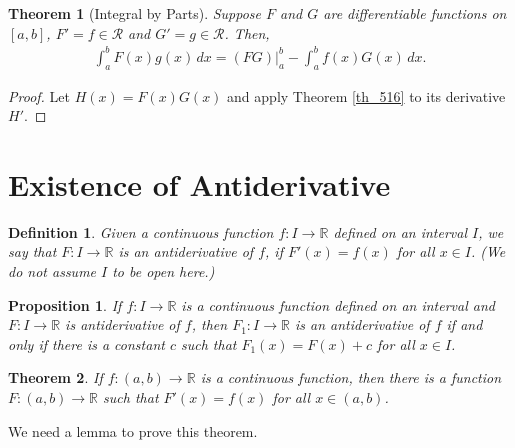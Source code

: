 \documentclass[10pt]{book}
\newtheorem{definition}{Definition}[chapter]
\newtheorem{theorem}{Theorem}[chapter]
\newtheorem{proposition}{Proposition}[chapter]
\theoremstyle{definition}
\numberwithin{equation}{chapter}
\begin{document}
\medskip

\begin{theorem}[Integral by Parts]
Suppose $F$ and $G$ are differentiable functions on $[a,b]$, $F' = f \in \mathscr{R}$ and $G' = g \in \mathscr{R}$. Then,
\begin{align*}
    \int^b_a F(x)g(x) \,dx = (FG)\bigg|^b_a - \int^b_a f(x)G(x) \,dx.
\end{align*}
\end{theorem}
\begin{proof}
Let $H(x) = F(x)G(x)$ and apply Theorem \ref{th_516} to its derivative $H'$.
\end{proof}

\medskip






\section{Existence of Antiderivative}

\begin{definition}
Given a continuous function $f: I \to \mathbb{R}$ defined on an interval $I$, we say that $F: I \to \mathbb{R}$ is an antiderivative of $f$, if $F'(x) = f(x)$ for all $x \in I$. (We do not assume $I$ to be open here.)
\end{definition}

\medskip

\begin{proposition}
If $f: I \to \mathbb{R}$ is a continuous function defined on an interval and $F: I \to \mathbb{R}$ is antiderivative of $f$, then $F_1: I \to \mathbb{R}$ is an antiderivative of $f$ if and only if there is a constant $c$ such that $F_1(x) = F(x) + c$ for all $x \in I$.
\end{proposition}

\medskip

\begin{theorem}\label{th_518}
If $f: (a,b) \to \mathbb{R}$ is a continuous function, then there is a function $F: (a,b) \to \mathbb{R}$ such that $F'(x) = f(x)$ for all $x \in (a,b)$.
\end{theorem}

\medskip

We need a lemma to prove this theorem.

\medskip
\end{document}
